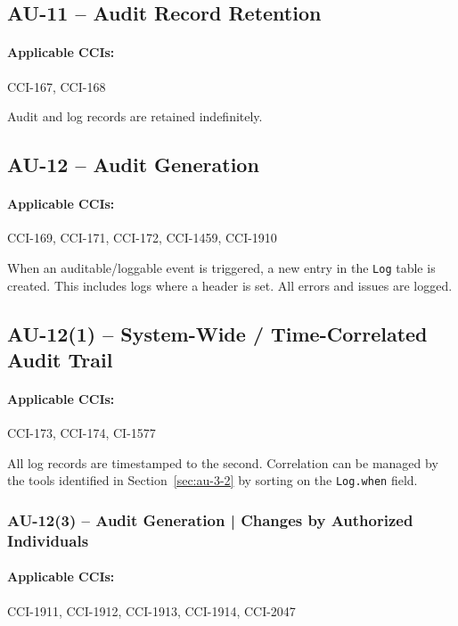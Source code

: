 \documentclass[letterpaper, 10pt, twoside]{article}
\begin{document}
\subsection{AU-11 -- Audit Record Retention}

\paragraph{Applicable CCIs:} CCI-167, CCI-168

Audit and log records are retained indefinitely.

\subsection{AU-12 -- Audit Generation}

\paragraph{Applicable CCIs:} CCI-169, CCI-171, CCI-172, CCI-1459, CCI-1910

When an auditable/loggable event is triggered, a new entry in the \texttt{Log} table is created. This includes logs where a header is set. All errors and issues are logged.

\subsection{AU-12(1) -- System-Wide / Time-Correlated Audit Trail}

\paragraph{Applicable CCIs:} CCI-173, CCI-174, CI-1577

All log records are timestamped to the second. Correlation can be managed by the tools identified in Section~\ref{sec:au-3-2} by sorting on the \texttt{Log.when} field.

\subsubsection{AU-12(3) -- Audit Generation | Changes by Authorized Individuals}
\label{au-12-3}

\paragraph{Applicable CCIs:} CCI-1911, CCI-1912, CCI-1913, CCI-1914, CCI-2047
\end{document}
